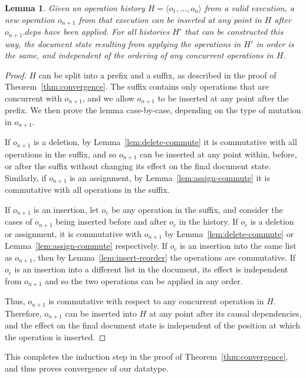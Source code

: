 \documentclass[10pt,journal,compsoc]{IEEEtran}
\newtheorem{lemma}[theorem]{Lemma}
\begin{document}
\begin{lemma}\label{lem:op-commute}
Given an operation history $H=\langle o_1, \dots, o_n \rangle$ from a valid execution, a new operation $o_{n+1}$ from that execution can be inserted at any point in $H$ after $o_{n+1}.\mathit{deps}$ have been applied. For all histories $H'$ that can be constructed this way, the document state resulting from applying the operations in $H'$ in order is the same, and independent of the ordering of any concurrent operations in $H$.
\end{lemma}

\begin{proof}
$H$ can be split into a prefix and a suffix, as described in the proof of Theorem~\ref{thm:convergence}. The suffix contains only operations that are concurrent with $o_{n+1}$, and we allow $o_{n+1}$ to be inserted at any point after the prefix. We then prove the lemma case-by-case, depending on the type of mutation in $o_{n+1}$. 

If $o_{n+1}$ is a deletion, by Lemma~\ref{lem:delete-commute} it is commutative with all operations in the suffix, and so $o_{n+1}$ can be inserted at any point within, before, or after the suffix without changing its effect on the final document state. Similarly, if $o_{n+1}$ is an assignment, by Lemma~\ref{lem:assign-commute} it is commutative with all operations in the suffix.

If $o_{n+1}$ is an insertion, let $o_c$ be any operation in the suffix, and consider the cases of $o_{n+1}$ being inserted before and after $o_c$ in the history. If $o_c$ is a deletion or assignment, it is commutative with $o_{n+1}$ by Lemma~\ref{lem:delete-commute} or Lemma~\ref{lem:assign-commute} respectively. If $o_c$ is an insertion into the same list as $o_{n+1}$, then by Lemma~\ref{lem:insert-reorder} the operations are commutative. If $o_c$ is an insertion into a different list in the document, its effect is independent from $o_{n+1}$ and so the two operations can be applied in any order.

Thus, $o_{n+1}$ is commutative with respect to any concurrent operation in $H$. Therefore, $o_{n+1}$ can be inserted into $H$ at any point after its causal dependencies, and the effect on the final document state is independent of the position at which the operation is inserted.
\end{proof}

This completes the induction step in the proof of Theorem~\ref{thm:convergence}, and thus proves convergence of our datatype.

\fi %
\end{document}
